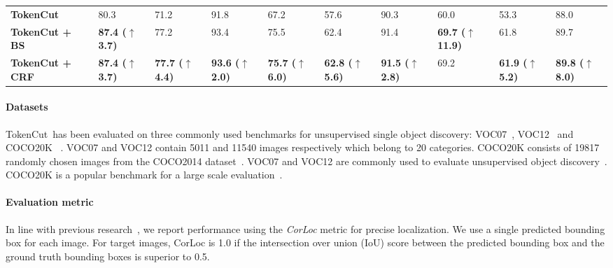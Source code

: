 \documentclass[twocolumn]{article}
\newcommand{\name} {TokenCut}
\begin{document}
\begin{table*}[!ht]
{\begin{tabular}{l|lll|lll|lll}
\midrule
\bf TokenCut & 80.3	& 71.2	& 91.8	& 67.2 &	57.6 & 	90.3 &	60.0 &	53.3 &	88.0 \\
\bf TokenCut + BS~\cite{barron2016fast} & \bf 87.4 (\textcolor{cssgreen}{$\uparrow$ \bf 3.7}) &  77.2 & 93.4 &  75.5 &	 62.4 &  91.4 & \bf 69.7 (\textcolor{cssgreen}{$\uparrow$ \bf 11.9}) &  61.8 &  89.7 \\
\bf TokenCut + CRF~\cite{krahenbuhl2011efficient} & \bf 87.4 (\textcolor{cssgreen}{$\uparrow$ \bf 3.7})	& \bf 77.7 (\textcolor{cssgreen}{$\uparrow$ \bf 4.4})	& \bf93.6 (\textcolor{cssgreen}{$\uparrow$ \bf 2.0})	& \bf 75.7 (\textcolor{cssgreen}{$\uparrow$ \bf 6.0}) &	\bf 62.8 (\textcolor{cssgreen}{$\uparrow$ \bf 5.6})& \bf 91.5 (\textcolor{cssgreen}{$\uparrow$ \bf 2.8}) & 69.2 &	\bf 61.9 (\textcolor{cssgreen}{$\uparrow$ \bf 5.2}) & \bf 89.8 (\textcolor{cssgreen}{$\uparrow$ \bf 8.0}) \\


\bottomrule
\end{tabular}
}
\label{tab:salient_detection}
\end{table*}

\paragraph*{Datasets}
\name~has been evaluated on three commonly used benchmarks for unsupervised single object discovery: VOC07~\cite{pascal-voc-2007}, VOC12~\cite{pascal-voc-2012} and COCO20K ~\cite{lin2014microsoft,vo2020toward}. 
VOC07 and VOC12 contain 5011 and 11540 images respectively which belong to 20 categories. COCO20K consists of 19817 randomly chosen images from the COCO2014 dataset~\cite{lin2014microsoft}. VOC07 and VOC12 are commonly used to evaluate unsupervised object discovery~\cite{vo2020toward,vo2021large,vo2019unsupervised, wei2019unsupervised,cho2015unsupervised}. COCO20K is a popular benchmark for a large scale evaluation~\cite{vo2020toward}.


\paragraph*{Evaluation metric}
In line with previous research~\cite{deselaers2010localizing, vo2020toward,vo2021large,vo2019unsupervised, wei2019unsupervised,cho2015unsupervised,siva2013looking},
we report performance using the \emph{CorLoc} metric for precise localization. We use a single predicted bounding box for each image. For target images, CorLoc is 1.0 if the intersection over union (IoU) score between the predicted bounding box and the ground truth bounding boxes is superior to 0.5.
\end{document}
